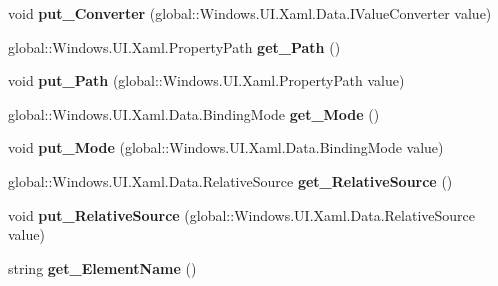 \begin{DoxyCompactItemize}
void {\bfseries put\+\_\+\+Converter} (global\+::\+Windows.\+U\+I.\+Xaml.\+Data.\+I\+Value\+Converter value)
\item 
\mbox{\label{interface_windows_1_1_u_i_1_1_xaml_1_1_data_1_1_i_binding_a9ca632846713b560304c9843f74ed7a8}} 
global\+::\+Windows.\+U\+I.\+Xaml.\+Property\+Path {\bfseries get\+\_\+\+Path} ()
\item 
\mbox{\label{interface_windows_1_1_u_i_1_1_xaml_1_1_data_1_1_i_binding_a196462b99c9682d263adef2e1bbefa09}} 
void {\bfseries put\+\_\+\+Path} (global\+::\+Windows.\+U\+I.\+Xaml.\+Property\+Path value)
\item 
\mbox{\label{interface_windows_1_1_u_i_1_1_xaml_1_1_data_1_1_i_binding_a0b5420b11dcee1ba04cc22736c406538}} 
global\+::\+Windows.\+U\+I.\+Xaml.\+Data.\+Binding\+Mode {\bfseries get\+\_\+\+Mode} ()
\item 
\mbox{\label{interface_windows_1_1_u_i_1_1_xaml_1_1_data_1_1_i_binding_a1677010e1baf985a2a7cb5a399ca34a8}} 
void {\bfseries put\+\_\+\+Mode} (global\+::\+Windows.\+U\+I.\+Xaml.\+Data.\+Binding\+Mode value)
\item 
\mbox{\label{interface_windows_1_1_u_i_1_1_xaml_1_1_data_1_1_i_binding_ae412c463e60fc889a9838767ab62109a}} 
global\+::\+Windows.\+U\+I.\+Xaml.\+Data.\+Relative\+Source {\bfseries get\+\_\+\+Relative\+Source} ()
\item 
\mbox{\label{interface_windows_1_1_u_i_1_1_xaml_1_1_data_1_1_i_binding_ae29a2f22aa4de72a0e7619934ac6e60a}} 
void {\bfseries put\+\_\+\+Relative\+Source} (global\+::\+Windows.\+U\+I.\+Xaml.\+Data.\+Relative\+Source value)
\item 
\mbox{\label{interface_windows_1_1_u_i_1_1_xaml_1_1_data_1_1_i_binding_a0dd35d95c316a5990ee063205f2afa4f}} 
string {\bfseries get\+\_\+\+Element\+Name} ()
\item 
\mbox{\label{interface_windows_1_1_u_i_1_1_xaml_1_1_data_1_1_i_binding_a4a547237eb0c5a322ff147af7bffa296}} 

\end{DoxyCompactItemize}
